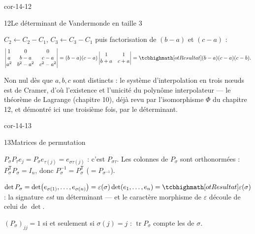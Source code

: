\begin{blocLivre}{cor-14-12}
\begin{corrige}{12}{Le déterminant de Vandermonde en taille 3}
\begin{questions}
  \item $C_2\leftarrow C_2-C_1$, $C_3\leftarrow C_3-C_1$ puis
    factorisation de $(b-a)$ et $(c-a)$ :
    \[
    \begin{vmatrix}1&0&0\\a&b-a&c-a\\a^{2}&b^{2}-a^{2}&c^{2}-a^{2}\end{vmatrix}
    =(b-a)(c-a)\begin{vmatrix}1&1\\b+a&c+a\end{vmatrix}
    =\res{(b-a)(c-a)(c-b)}.
    \]
  \item Non nul dès que $a,b,c$ sont distincts : le système
    d'interpolation en trois nœuds est de Cramer, d'où l'existence et
    l'unicité du polynôme interpolateur — le théorème de Lagrange
    (chapitre 10), déjà revu par l'isomorphisme $\Phi$ du chapitre 12, et
    démontré ici une troisième fois, par le déterminant.
\end{questions}
\end{corrige}
\end{blocLivre}

\begin{blocLivre}{cor-14-13}
\begin{corrige}{13}{Matrices de permutation}
\begin{questions}
  \item $P_\sigma P_\tau e_j=P_\sigma e_{\tau(j)}=e_{\sigma\tau(j)}$ :
    c'est $P_{\sigma\tau}$. Les colonnes de $P_\sigma$ sont
    orthonormées : $P_\sigma^{\mathsf T}P_\sigma=I_n$, donc
    $P_\sigma^{-1}=P_\sigma^{\mathsf T}$ ($=P_{\sigma^{-1}}$).
  \item $\det P_\sigma=\det\bigl(e_{\sigma(1)},\dots,e_{\sigma(n)}\bigr)
    =\varepsilon(\sigma)\det(e_1,\dots,e_n)=\res{\varepsilon(\sigma)}$ :
    la signature \emph{est} un déterminant — et le caractère morphisme de
    $\varepsilon$ découle de celui de $\det$.
  \item $(P_\sigma)_{jj}=1$ si et seulement si $\sigma(j)=j$ :
    $\operatorname{tr}P_\sigma$ compte les  de
    $\sigma$.
\end{questions}
\end{corrige}
\end{blocLivre}


